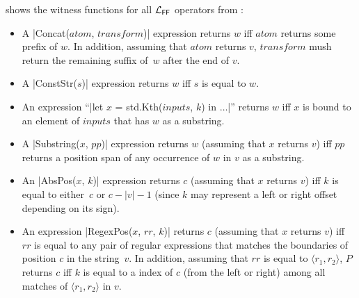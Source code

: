 

\begin{example}
     shows the witness functions for all $\mathcal{L}_{\mathsf{FF}}$ operators from :
    \begin{itemize}[nosep]
        \item A \dslinline|Concat($atom$, $transform$)| expression returns $w$ iff $atom$ returns some prefix of $w$.
            In addition, assuming that $atom$ returns $v$, $transform$ mush return the remaining suffix of~$w$ after the
            end of $v$.
        \item A \dslinline|ConstStr($s$)| expression returns $w$ iff $s$ is equal to $w$.
        \item An expression ``\dslinline|let $x$ = std.Kth($inputs$, $k$) in $\dots$|'' returns $w$ iff $x$ is bound to
            an element of $inputs$ that has $w$ as a substring.
        \item A \dslinline|Substring($x$, $pp$)| expression returns $w$ (assuming that $x$ returns $v$) iff $pp$ returns
            a position span of any occurrence of $w$ in $v$ as a substring.
        \item An \dslinline|AbsPos($x$, $k$)| expression returns $c$ (assuming that $x$ returns $v$) iff $k$ is equal to
            either~$c$ or $c-|v|-1$ (since $k$ may represent a left or right offset depending on its sign).
        \item An expression \dslinline|RegexPos($x$, $rr$, $k$)| returns $c$ (assuming that $x$ returns $v$) iff $rr$ is
            equal to any pair of regular expressions that matches the boundaries of position $c$ in the string~$v$.
            In addition, assuming that $rr$ is equal to $\langle r_1, r_2\rangle$, $P$ returns $c$ iff $k$ is equal to
            a index of $c$ (from the left or right) among all matches of $\langle r_1, r_2\rangle$ in $v$.
    \end{itemize}
    \label{ex:wf:flashfill}
\end{example}

